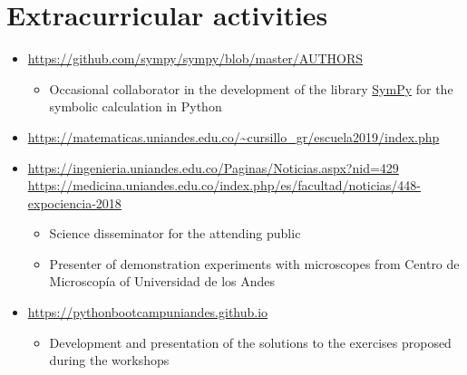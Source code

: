 \documentclass[11pt, letterpaper, sans]{moderncv}        %
\begin{document}
\section{Extracurricular activities}
	\begin{itemize}
		\item{
			{
				\url{https://github.com/sympy/sympy/blob/master/AUTHORS}
				\vspace{3pt}
				\begin{itemize}
					\item Occasional collaborator in the development of the library \href{https://www.sympy.org/en/index.html}{\color{blue}SymPy} for the symbolic calculation in {\color{blue}Python}
				\end{itemize}
			}
		}
		\item{
			{
				\url{https://matematicas.uniandes.edu.co/~cursillo_gr/escuela2019/index.php}
			}
		}
	
		\item{
			{
				\url{https://ingenieria.uniandes.edu.co/Paginas/Noticias.aspx?nid=429}\\
				\url{https://medicina.uniandes.edu.co/index.php/es/facultad/noticias/448-expociencia-2018}
				\vspace{3pt}
				\begin{itemize}
					\item Science disseminator for the attending public
					\item Presenter of demonstration experiments with microscopes from Centro de Microscop\'ia of Universidad de los Andes
				\end{itemize}
			}
		}
	
		\item{
			{
				\url{https://pythonbootcampuniandes.github.io}
				\vspace{3pt}
				\begin{itemize}
					\item Development and presentation of the solutions to the exercises proposed during the workshops
				\end{itemize}
			}
		}
	

\end{itemize}
\end{document}
